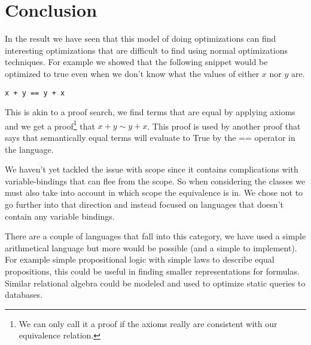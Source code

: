 
\section{Conclusion}
In the result we have seen that this model of doing optimizations can find interesting
optimizations that are difficult to find using normal optimizations techniques.
For example we showed that the following snippet would be optimized to true even
when we don't know what the values of either $x$ nor $y$ are.

\begin{verbatim}
x + y == y + x
\end{verbatim}

This is akin to a proof search, we find terms that are equal by applying axioms
and we get a proof\footnote{We can only call it a proof if the axioms really are 
consistent with our equivalence relation.} that $x + y \sim y + x$. This proof
is used by another proof that says that semantically equal terms will evaluate to 
True by the == operator in the language.

We haven't yet tackled the issue with scope since it contains complications
with variable-bindings that can flee from the scope. So when considering the classes
we must also take into account in which scope the equivalence is in. We chose not
to go further into that direction and instead focused on languages that doesn't
contain any variable bindings.

There are a couple of languages that fall into this category, we have used a simple
arithmetical language but more would be possible (and a simple to implement). For
example simple propositional logic with simple laws to describe equal propositions,
this could be useful in finding smaller representations for formulas. Similar
relational algebra could be modeled and used to optimize static queries to databases.

 